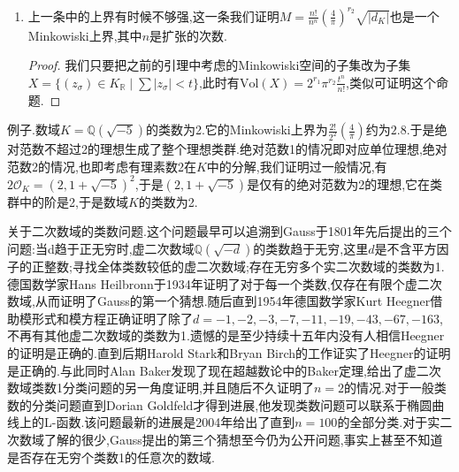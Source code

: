 \begin{enumerate}
\begin{proof}
		对任意$\varepsilon>0$,可取正实数组$\{c_{\sigma},\sigma\in\mathrm{Hom}_{\mathbb{Q}}(K,\mathbb{C})\}$使得使得$c_{\sigma}=c_{\overline{\sigma}}$,并且满足:
		$$\prod_{\sigma}c_{\sigma}=\left(\frac{2}{\pi}\right)^{r_2}\sqrt{|d_K|}\mathrm{N}_K(I)+\varepsilon$$
		
		于是按照上一个定理,可以找到非零元$a\in I$,满足$|\sigma(a)|<c_{\sigma},\forall\sigma$.于是:
		$$|\mathrm{N}_{K/\mathbb{Q}}(a)|=\prod|\sigma(a)|<\left(\frac{2}{\pi}\right)^{r_2}\sqrt{|d_K|}\mathrm{N}_K(I)+\varepsilon$$
		
		现在按照左侧这个范数是整数,于是可以取足够小的$\varepsilon$使得:
		$$|\mathrm{N} _{K/\mathbb{Q}}(a)|=\prod|\sigma(a)|\le\left(\frac{2}{\pi}\right)^{r_2}\sqrt{|d_K|}\mathrm{N}_K(I)$$
	\end{proof}
    \item 上一条中的上界有时候不够强,这一条我们证明$M=\frac{n!}{n^n}\left(\frac{4}{\pi}\right)^{r_2}\sqrt{|d_K|}$也是一个Minkowiski上界,其中$n$是扩张的次数.
    \begin{proof}
    	
    	我们只要把之前的引理中考虑的Minkowiski空间的子集改为子集$X=\{(z_{\sigma})\in K_{\mathbb{R}}\mid\sum|z_{\sigma}|<t\}$,此时有$\mathrm{Vol}(X)=2^{r_1}\pi^{r_2}\frac{t^n}{n!}$,类似可证明这个命题.
    \end{proof}
\end{enumerate}

例子.数域$K=\mathbb{Q}(\sqrt{-5})$的类数为2.它的Minkowiski上界为$\frac{2!}{2^2}\left(\frac{4}{\pi}\right)$约为$2.8$.于是绝对范数不超过2的理想生成了整个理想类群.绝对范数1的情况即对应单位理想,绝对范数2的情况,也即考虑有理素数2在$K$中的分解,我们证明过一般情况,有$2\mathscr{O}_K=(2,1+\sqrt{-5})^2$,于是$(2,1+\sqrt{-5})$是仅有的绝对范数为2的理想,它在类群中的阶是2,于是数域$K$的类数为2.

关于二次数域的类数问题.这个问题最早可以追溯到Gauss于1801年先后提出的三个问题:当d趋于正无穷时,虚二次数域$\mathbb{Q}(\sqrt{-d})$的类数趋于无穷,这里$d$是不含平方因子的正整数;寻找全体类数较低的虚二次数域;存在无穷多个实二次数域的类数为1.德国数学家Hans Heilbronn于1934年证明了对于每一个类数,仅存在有限个虚二次数域,从而证明了Gauss的第一个猜想.随后直到1954年德国数学家Kurt Heegner借助模形式和模方程正确证明了除了$d=-1,-2,-3,-7,-11,-19,-43,-67,-163$,不再有其他虚二次数域的类数为1.遗憾的是至少持续十五年内没有人相信Heegner的证明是正确的.直到后期Harold Stark和Bryan Birch的工作证实了Heegner的证明是正确的.与此同时Alan Baker发现了现在超越数论中的Baker定理,给出了虚二次数域类数1分类问题的另一角度证明,并且随后不久证明了$n=2$的情况.对于一般类数的分类问题直到Dorian Goldfeld才得到进展,他发现类数问题可以联系于椭圆曲线上的L-函数.该问题最新的进展是2004年给出了直到$n=100$的全部分类.对于实二次数域了解的很少,Gauss提出的第三个猜想至今仍为公开问题,事实上甚至不知道是否存在无穷个类数1的任意次的数域.

